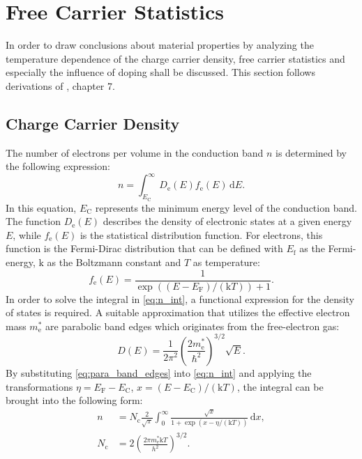 \section{Free Carrier Statistics}
In order to draw conclusions about material properties by analyzing
the temperature dependence of the charge carrier density,
free carrier statistics and especially the influence of doping shall be
discussed.
This section follows derivations of , chapter 7.
\subsection{Charge Carrier Density}
The number of electrons per volume in the conduction band $n$ is
determined by the following expression:
\begin{equation}
	n=\int _{E_{\mathrm{C}}}^{\infty} D_{\mathrm{e}}(E)
	f_{\mathrm{e}}(E)\, \mathrm{d}E.
	\label{eq:n_int}
\end{equation}
In this equation, $E_{\mathrm{C}}$ represents the minimum energy level of
the conduction band. The function $D_{\mathrm{e}}(E)$ describes
the density of electronic states at a given energy $E$, while
$f_{\mathrm{e}}(E)$ is the statistical distribution function.
For electrons, this function is the Fermi-Dirac distribution that can be
defined with $E_\mathrm{f}$ as the Fermi-energy, $\mathrm{k}$ as the
Boltzmann constant and $T$ as temperature:
\begin{equation}
	f_{\mathrm{e}}(E)
	=\frac{1}{\exp((E-E_{\mathrm{F}})/(\mathrm{k}T))+1}.
\end{equation}
In order to solve the integral in \cref{eq:n_int}, a functional
expression for the density of states is required.
A suitable approximation that utilizes the effective electron mass
$m^*_\mathrm{e}$ are
parabolic band edges which originates from the free-electron gas:
\begin{equation}
	D(E)=\frac{1}{2\pi^2}
	\left( \frac{2m^*_\mathrm{e}}{\hbar^2} \right)^{3 / 2} \sqrt{E}.
	\label{eq:para_band_edges}
\end{equation}
By substituting \cref{eq:para_band_edges} into \cref{eq:n_int} and applying
the transformations $\eta=E_\mathrm{F}-E_\mathrm{C}$,
$x = (E-E_\mathrm{C}) / (\mathrm{k} T)$, the integral can be brought into
the following form:
\begin{align}
	n            & = N_\mathrm{c} \frac{2}{\sqrt{\pi}}
	\int_{0}^{\infty} \frac{\sqrt{ x }}{1+\exp(x-\eta / (\mathrm{k}T))} \,
	\mathrm{d}x \label{eq:n_int_2},                                        \\
	N_\mathrm{c} & = 2 \left( \frac{2 \pi m^*_\mathrm{e} \mathrm{k}T}{h^2}
	\right)^{3 / 2}.
\end{align}
